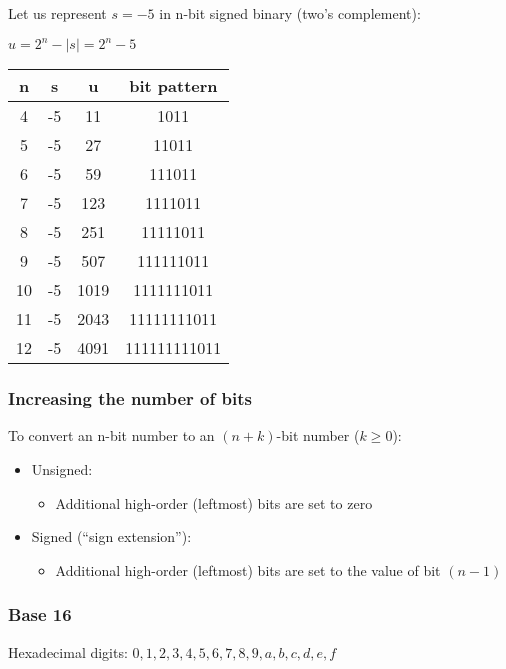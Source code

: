 \documentclass[12pt]{article}
\begin{document}
Let us represent \( s = -5 \) in n-bit signed binary (two's complement):

\( u = 2^n - \left| s \right| = 2^n - 5 \)

\begin{center}
\begin{tabular}{cccc}
n & s & u & bit pattern \\
\hline
4 & -5 & 11 & 1011 \\
5 & -5 & 27 & 11011 \\
6 & -5 & 59 & 111011 \\
7 & -5 & 123 & 1111011 \\
8 & -5 & 251 & 11111011 \\
9 & -5 & 507 & 111111011 \\
10 & -5 & 1019 & 1111111011 \\
11 & -5 & 2043 & 11111111011 \\
12 & -5 & 4091 & 111111111011 \\
\end{tabular}
\end{center}

\subsubsection{Increasing the number of bits}

To convert an n-bit number to an \( (n + k) \)-bit number (\( k \geq 0 \)):

\begin{itemize}
\item Unsigned:
\begin{itemize}
\item Additional high-order (leftmost) bits are set to zero
\end{itemize}
\item Signed (``sign extension''):
\begin{itemize}
\item Additional high-order (leftmost) bits are set to the value of bit \( (n - 1) \)
\end{itemize}
\end{itemize}
\subsubsection{Base 16}

Hexadecimal digits: \( 0, 1, 2, 3, 4, 5, 6, 7, 8, 9, a, b, c, d, e, f \)
\end{document}
